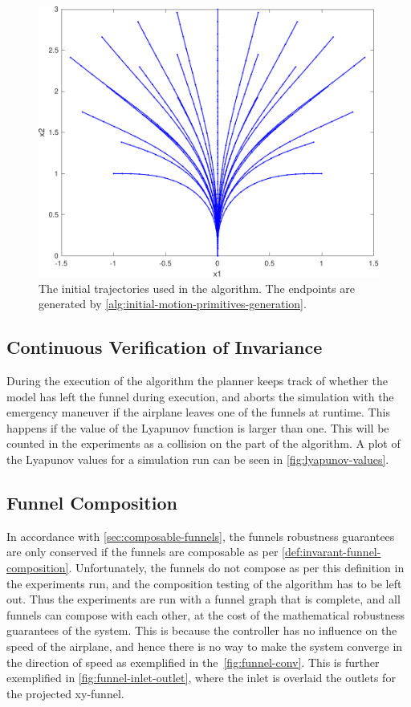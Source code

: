 \begin{figure}[!t]
  \centering
  \includegraphics[width=.8\columnwidth]{figures/experiments/initial-trajectories}
  \caption[The experiment trajectory set]{The initial trajectories used in the
    \rrtfunnel{} algorithm. The endpoints are generated by
    \cref{alg:initial-motion-primitives-generation}.}
  \label{fig:intial-trajectories-exp}
\end{figure}

\subsection{Continuous Verification of Invariance}
\label{subsec:check-vehicle-in-funnel}

During the execution of the \rrtfunnel{} algorithm the planner keeps track of
whether the model has left the funnel during execution, and aborts the
simulation with the emergency maneuver if the airplane leaves one of the funnels
at runtime. This happens if the value of the Lyapunov function is larger than
one. This will be counted in the experiments as a collision on the part of the
\rrtfunnel{} algorithm. A plot of the Lyapunov values for a simulation run can
be seen in \cref{fig:lyapunov-values}.

\subsection{Funnel Composition}
\label{subsec:funnel-no-composable}

In accordance with \cref{sec:composable-funnels}, the funnels robustness
guarantees are only conserved if the funnels are composable as per
\cref{def:invarant-funnel-composition}. Unfortunately, the funnels do not
compose as per this definition in the experiments run, and the composition
testing of the algorithm has to be left out. Thus the experiments are run with a
funnel graph that is complete, and all funnels can compose with each other, at
the cost of the mathematical robustness guarantees of the system. This is
because the controller has no influence on the speed of the airplane, and hence
there is no way to make the system converge in the direction of speed as
exemplified in the~\cref{fig:funnel-conv}. This is further exemplified in
\cref{fig:funnel-inlet-outlet}, where the inlet is overlaid the outlets for the
projected xy-funnel.

